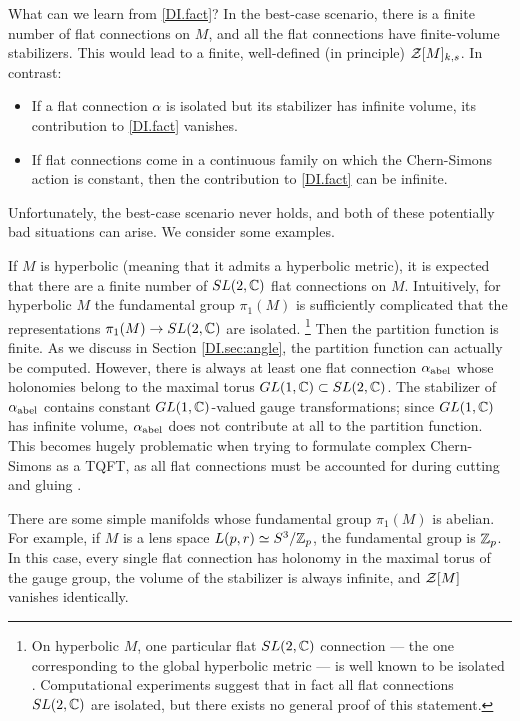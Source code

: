\documentclass[12pt]{article}
\begin{document}
What can we learn from \eqref{DI.fact}? In the best-case scenario, there is a finite number of flat connections on $M$, and all the flat connections have finite-volume stabilizers. This would lead to a finite, well-defined (in principle) $\mathcal{Z}[M]_{k,s}$. In contrast:
%
\begin{itemize}
\item If a flat connection $\alpha$ is isolated but its stabilizer has infinite volume, its contribution to \eqref{DI.fact} vanishes.
\item If flat connections come in a continuous family on which the Chern-Simons action is constant, then the contribution to \eqref{DI.fact} can be infinite.
\end{itemize}
%
Unfortunately, the best-case scenario never holds, and both of these potentially bad situations can arise. We consider some examples.

If $M$ is hyperbolic (meaning that it admits a hyperbolic metric), it is expected that there are a finite number of $SL(2,{\mathbb C})$ flat connections on $M$.
Intuitively, for hyperbolic $M$ the fundamental group $\pi_1(M)$ is sufficiently complicated that the representations $\pi_1(M)\to SL(2,{\mathbb C})$ are isolated.%
%
\footnote{On hyperbolic $M$, one particular flat $SL(2,{\mathbb C})$ connection --- the one corresponding to the global hyperbolic metric --- is well known to be isolated \cite{DImostow-1973, DIthurston-1980}. Computational experiments suggest that in fact all flat connections $SL(2,{\mathbb C})$ are isolated, but there exists no general proof of this statement.} %
% 
Then the partition function is finite. As we discuss in Section \ref{DI.sec:angle}, the partition function can actually be computed.
However, there is always at least one flat connection $\alpha_{\rm abel}$ whose holonomies belong to the maximal torus $GL(1,{\mathbb C})\subset SL(2,{\mathbb C})$. The stabilizer of $\alpha_{\rm abel}$ contains constant $GL(1,{\mathbb C})$-valued gauge transformations; since $GL(1,{\mathbb C})$ has infinite volume, $\alpha_{\rm abel}$ does not contribute at all to the partition function. This becomes hugely problematic when trying to formulate complex Chern-Simons as a TQFT, as all flat connections must be accounted for during cutting and gluing \cite{DICDGS}.

There are some simple manifolds whose fundamental group $\pi_1(M)$ is abelian. For example, if $M$ is a lens space $L(p,r)\simeq S^3/{\mathbb Z}_p$, the fundamental group is ${\mathbb Z}_p$. In this case, every single flat connection has holonomy in the maximal torus of the gauge group, the volume of the stabilizer is always infinite, and $\mathcal{Z}[M]$ vanishes identically.
\end{document}
